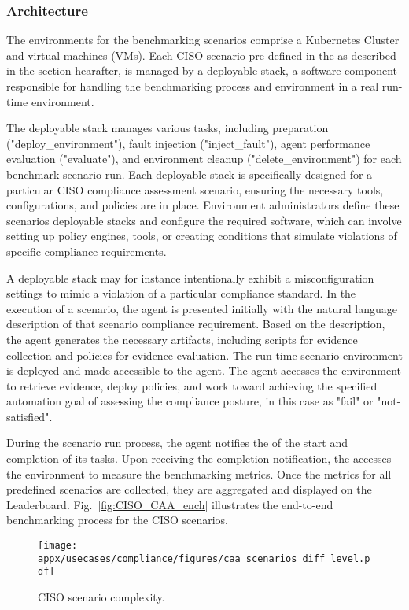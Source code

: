 \subsubsection{\bench Architecture}

The environments for the benchmarking scenarios comprise a Kubernetes Cluster and virtual machines (VMs). Each CISO scenario pre-defined in the \bench as described in the section hearafter, is managed by a deployable stack, a software component responsible for handling the benchmarking process and environment in a real run-time environment. 

The deployable stack manages various tasks, including preparation ("deploy\_environment"), fault injection ("inject\_fault"), agent performance evaluation ("evaluate"), and environment cleanup ("delete\_environment") for each benchmark scenario run. Each deployable stack is specifically designed for a particular CISO compliance assessment scenario, ensuring the necessary tools, configurations, and policies are in place. Environment administrators define these scenarios deployable stacks and configure the required software, which can involve setting up policy engines, tools, or creating conditions that simulate violations of specific compliance requirements.

A deployable stack may for instance intentionally exhibit a misconfiguration settings to mimic a violation of a particular compliance standard.  In the execution of a scenario, the agent is presented initially with the natural language description of that scenario compliance requirement. Based on the description, the agent generates the necessary artifacts, including scripts for evidence collection and policies for evidence evaluation. The run-time scenario environment is deployed and made accessible to the agent. The agent accesses the environment to retrieve evidence, deploy policies, and work toward achieving the specified automation goal of assessing the compliance posture, in this case as "fail" or "not-satisfied".

During the scenario run process, the agent notifies the \bench of the start and completion of its tasks. Upon receiving the completion notification, the \bench accesses the environment to measure the benchmarking metrics. Once the metrics for all predefined scenarios are collected, they are aggregated and displayed on the \bench Leaderboard. Fig.~\ref{fig:CISO_CAA_ench} illustrates the end-to-end benchmarking process for the CISO scenarios.


 \begin{figure}[t!]
        \centering
        \texttt{[image: appx/usecases/compliance/figures/caa\_scenarios\_diff\_level.pdf]}
        \caption{CISO scenario complexity.}
        \label{fig:ciso-task-difficulty2}
    \end{figure}
    
